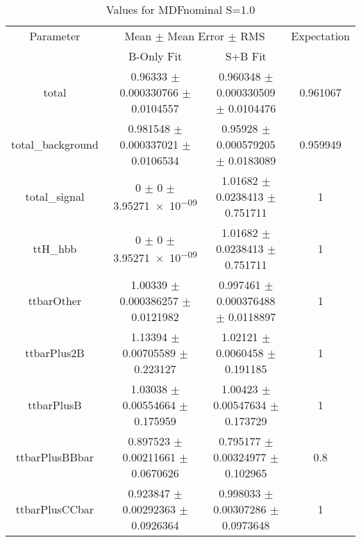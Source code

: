 \begin{table}
\centering
\caption{Values for MDFnominal S=1.0}
\begin{tabular}{cccc}
\toprule
Parameter & \multicolumn{2}{c}{Mean $\pm$ Mean Error $\pm$ RMS} & Expectation\\
 & B-Only Fit & S+B Fit & \\
\midrule
total & \num{0.96333} $\pm$ \num{0.000330766} $\pm$ \num{0.0104557} & \num{0.960348} $\pm$ \num{0.000330509} $\pm$ \num{0.0104476} & \num{0.961067}\\
total\_background & \num{0.981548} $\pm$ \num{0.000337021} $\pm$ \num{0.0106534} & \num{0.95928} $\pm$ \num{0.000579205} $\pm$ \num{0.0183089} & \num{0.959949}\\
total\_signal & \num{0} $\pm$ \num{0} $\pm$ \num{3.95271e-09} & \num{1.01682} $\pm$ \num{0.0238413} $\pm$ \num{0.751711} & \num{1}\\
ttH\_hbb & \num{0} $\pm$ \num{0} $\pm$ \num{3.95271e-09} & \num{1.01682} $\pm$ \num{0.0238413} $\pm$ \num{0.751711} & \num{1}\\
ttbarOther & \num{1.00339} $\pm$ \num{0.000386257} $\pm$ \num{0.0121982} & \num{0.997461} $\pm$ \num{0.000376488} $\pm$ \num{0.0118897} & \num{1}\\
ttbarPlus2B & \num{1.13394} $\pm$ \num{0.00705589} $\pm$ \num{0.223127} & \num{1.02121} $\pm$ \num{0.0060458} $\pm$ \num{0.191185} & \num{1}\\
ttbarPlusB & \num{1.03038} $\pm$ \num{0.00554664} $\pm$ \num{0.175959} & \num{1.00423} $\pm$ \num{0.00547634} $\pm$ \num{0.173729} & \num{1}\\
ttbarPlusBBbar & \num{0.897523} $\pm$ \num{0.00211661} $\pm$ \num{0.0670626} & \num{0.795177} $\pm$ \num{0.00324977} $\pm$ \num{0.102965} & \num{0.8}\\
ttbarPlusCCbar & \num{0.923847} $\pm$ \num{0.00292363} $\pm$ \num{0.0926364} & \num{0.998033} $\pm$ \num{0.00307286} $\pm$ \num{0.0973648} & \num{1}\\
\bottomrule
\end{tabular}
\end{table}